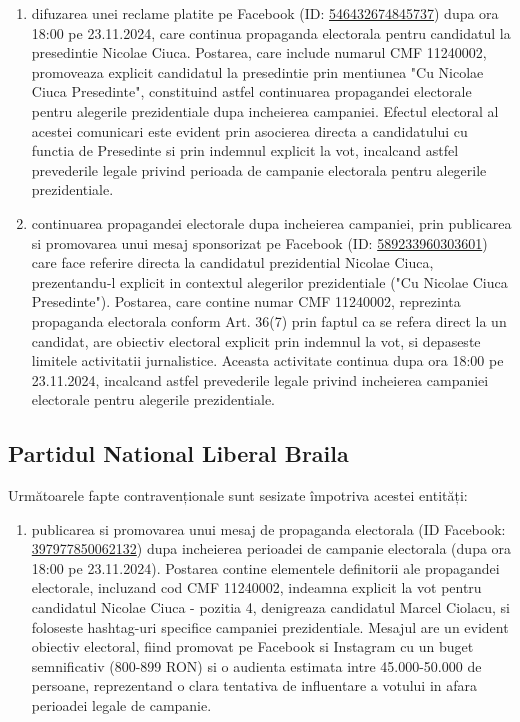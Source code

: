 \documentclass[a4paper,12pt]{article}
\begin{document}
\begin{enumerate}[leftmargin=*, label=\arabic*.)]
    \item difuzarea unei reclame platite pe Facebook (ID: \href{https://www.facebook.com/ads/library/?id=546432674845737}{546432674845737}) dupa ora 18:00 pe 23.11.2024, care continua propaganda electorala pentru candidatul la presedintie Nicolae Ciuca. Postarea, care include numarul CMF 11240002, promoveaza explicit candidatul la presedintie prin mentiunea "Cu Nicolae Ciuca Presedinte", constituind astfel continuarea propagandei electorale pentru alegerile prezidentiale dupa incheierea campaniei. Efectul electoral al acestei comunicari este evident prin asocierea directa a candidatului cu functia de Presedinte si prin indemnul explicit la vot, incalcand astfel prevederile legale privind perioada de campanie electorala pentru alegerile prezidentiale.
    \item continuarea propagandei electorale dupa incheierea campaniei, prin publicarea si promovarea unui mesaj sponsorizat pe Facebook (ID: \href{https://www.facebook.com/ads/library/?id=589233960303601}{589233960303601}) care face referire directa la candidatul prezidential Nicolae Ciuca, prezentandu-l explicit in contextul alegerilor prezidentiale ("Cu Nicolae Ciuca Presedinte"). Postarea, care contine numar CMF 11240002, reprezinta propaganda electorala conform Art. 36(7) prin faptul ca se refera direct la un candidat, are obiectiv electoral explicit prin indemnul la vot, si depaseste limitele activitatii jurnalistice. Aceasta activitate continua dupa ora 18:00 pe 23.11.2024, incalcand astfel prevederile legale privind incheierea campaniei electorale pentru alegerile prezidentiale.
\end{enumerate}

\vspace{0.5cm}

\subsection{Partidul National Liberal Braila}
Următoarele fapte contravenționale sunt sesizate împotriva acestei entități:

\begin{enumerate}[leftmargin=*, label=\arabic*.)]
    \item publicarea si promovarea unui mesaj de propaganda electorala (ID Facebook: \href{https://www.facebook.com/ads/library/?id=397977850062132}{397977850062132}) dupa incheierea perioadei de campanie electorala (dupa ora 18:00 pe 23.11.2024). Postarea contine elementele definitorii ale propagandei electorale, incluzand cod CMF 11240002, indeamna explicit la vot pentru candidatul Nicolae Ciuca - pozitia 4, denigreaza candidatul Marcel Ciolacu, si foloseste hashtag-uri specifice campaniei prezidentiale. Mesajul are un evident obiectiv electoral, fiind promovat pe Facebook si Instagram cu un buget semnificativ (800-899 RON) si o audienta estimata intre 45.000-50.000 de persoane, reprezentand o clara tentativa de influentare a votului in afara perioadei legale de campanie.
\end{enumerate}
\end{document}
